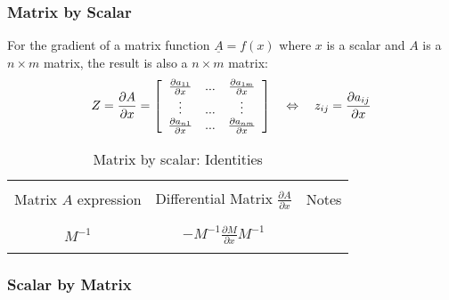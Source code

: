 
\subsubsection{Matrix by Scalar}

For the gradient of a matrix function $\underline{A} = f(x)$ where $x$ is a scalar and $A$ is a $n \times m$ matrix, the result is also a $n \times m$ matrix:
\begin{align}
 Z = \frac{\partial A}{\partial x} =
 \left[ \begin{array}{c c c }
         \frac{\partial a_{11}}{\partial x}   & ... & \frac{\partial a_{1m}}{\partial x} \\
         \vdots                             & ... & \vdots                          \\
         \frac{\partial a_{n1}}{\partial x}   & ... & \frac{\partial a_{nm}}{\partial x} \\
 \end{array} \right]
 \quad\Leftrightarrow\quad
 z_{ij} = \frac{\partial a_{ij}}{\partial x}
\end{align}

\begin{table}[H]
 \centering
 \caption{ Matrix by scalar: Identities}
 \label{scavec}
 \begin{tabular}{ | c | c | c |}
  \hline \hline & & \\
  Matrix $A$ expression & Differential Matrix $\frac{\partial A}{\partial x}$  & Notes \\ & & \\
  \hline \hline & & \\
  $ M^{-1} $ &
  $ -M^{-1} \frac{\partial M}{\partial x} M^{-1} $ &
  \\ & & \\
  \hline
 \end{tabular}
\end{table}



\subsubsection{Scalar by Matrix}

